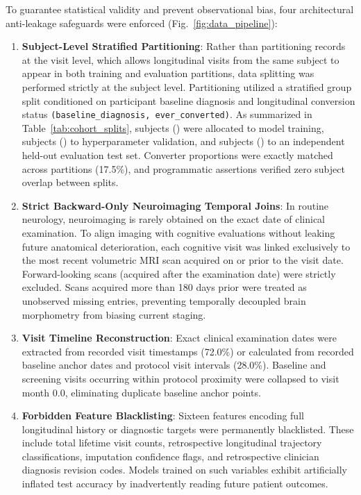 To guarantee statistical validity and prevent observational bias, four architectural anti-leakage safeguards were enforced (Fig.~\ref{fig:data_pipeline}):
\begin{enumerate}
    \item \textbf{Subject-Level Stratified Partitioning}: Rather than partitioning records at the visit level, which allows longitudinal visits from the same subject to appear in both training and evaluation partitions, data splitting was performed strictly at the subject level. Partitioning utilized a stratified group split conditioned on participant baseline diagnosis and longitudinal conversion status \texttt{(baseline\_diagnosis, ever\_converted)}. As summarized in Table~\ref{tab:cohort_splits}, \TrainSubjects{} subjects (\TrainPct{}) were allocated to model training, \ValSubjects{} subjects (\ValPct{}) to hyperparameter validation, and \TestSubjects{} subjects (\TestPct{}) to an independent held-out evaluation test set. Converter proportions were exactly matched across partitions (17.5\%), and programmatic assertions verified zero subject overlap between splits.
    \item \textbf{Strict Backward-Only Neuroimaging Temporal Joins}: In routine neurology, neuroimaging is rarely obtained on the exact date of clinical examination. To align imaging with cognitive evaluations without leaking future anatomical deterioration, each cognitive visit was linked exclusively to the most recent volumetric MRI scan acquired on or prior to the visit date. Forward-looking scans (acquired after the examination date) were strictly excluded. Scans acquired more than 180 days prior were treated as unobserved missing entries, preventing temporally decoupled brain morphometry from biasing current staging.
    \item \textbf{Visit Timeline Reconstruction}: Exact clinical examination dates were extracted from recorded visit timestamps (72.0\%) or calculated from recorded baseline anchor dates and protocol visit intervals (28.0\%). Baseline and screening visits occurring within protocol proximity were collapsed to visit month $0.0$, eliminating duplicate baseline anchor points.
    \item \textbf{Forbidden Feature Blacklisting}: Sixteen features encoding full longitudinal history or diagnostic targets were permanently blacklisted. These include total lifetime visit counts, retrospective longitudinal trajectory classifications, imputation confidence flags, and retrospective clinician diagnosis revision codes. Models trained on such variables exhibit artificially inflated test accuracy by inadvertently reading future patient outcomes.

\end{enumerate}
